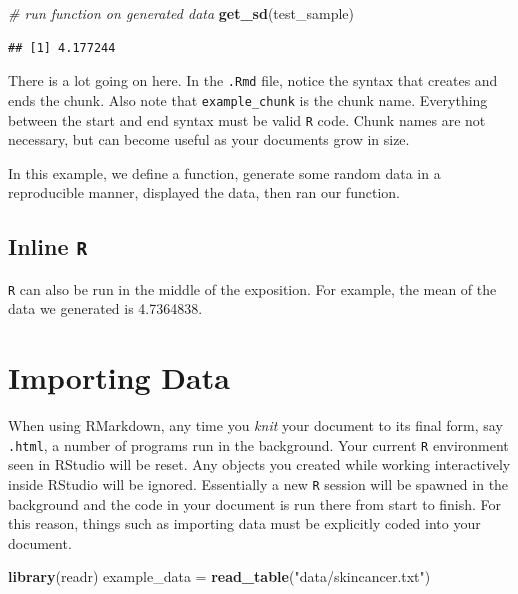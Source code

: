 \documentclass[
]{book}
\newenvironment{Shaded}{\begin{snugshade}}{\end{snugshade}}
\newcommand{\CommentTok}[1]{\textcolor[rgb]{0.56,0.35,0.01}{\textit{#1}}}
\newcommand{\KeywordTok}[1]{\textcolor[rgb]{0.13,0.29,0.53}{\textbf{#1}}}
\newcommand{\NormalTok}[1]{#1}
\newcommand{\StringTok}[1]{\textcolor[rgb]{0.31,0.60,0.02}{#1}}
\begin{document}
\begin{Shaded}
\begin{Highlighting}[]
  \CommentTok{# run function on generated data}
  \KeywordTok{get_sd}\NormalTok{(test_sample)}
\end{Highlighting}
\end{Shaded}

\begin{verbatim}
## [1] 4.177244
\end{verbatim}

There is a lot going on here. In the \texttt{.Rmd} file, notice the syntax that creates and ends the chunk. Also note that \texttt{example\_chunk} is the chunk name. Everything between the start and end syntax must be valid \texttt{R} code. Chunk names are not necessary, but can become useful as your documents grow in size.

In this example, we define a function, generate some random data in a reproducible manner, displayed the data, then ran our function.

\hypertarget{inline-r}{%
\subsection{\texorpdfstring{Inline \texttt{R}}{Inline R}}\label{inline-r}}

\texttt{R} can also be run in the middle of the exposition. For example, the mean of the data we generated is 4.7364838.

\hypertarget{importing-data}{%
\section{Importing Data}\label{importing-data}}

When using RMarkdown, any time you \emph{knit} your document to its final form, say \texttt{.html}, a number of programs run in the background. Your current \texttt{R} environment seen in RStudio will be reset. Any objects you created while working interactively inside RStudio will be ignored. Essentially a new \texttt{R} session will be spawned in the background and the code in your document is run there from start to finish. For this reason, things such as importing data must be explicitly coded into your document.

\begin{Shaded}
\begin{Highlighting}[]
  \KeywordTok{library}\NormalTok{(readr)}
\NormalTok{  example_data =}\StringTok{ }\KeywordTok{read_table}\NormalTok{(}\StringTok{"data/skincancer.txt"}\NormalTok{)}
\end{Highlighting}
\end{Shaded}
\end{document}
